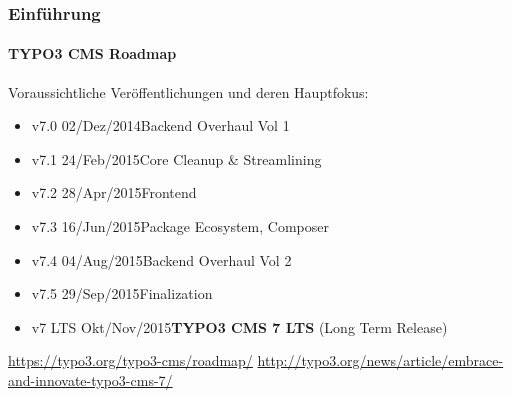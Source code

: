 \begin{frame}[fragile]
	\frametitle{Einführung}
	\framesubtitle{TYPO3 CMS Roadmap}

	Voraussichtliche Veröffentlichungen und deren Hauptfokus:

	\begin{itemize}
		\item v7.0 \tabto{1.1cm}02/Dez/2014\tabto{3.4cm}Backend Overhaul Vol 1
		\item v7.1 \tabto{1.1cm}24/Feb/2015\tabto{3.4cm}Core Cleanup \& Streamlining
		\item v7.2 \tabto{1.1cm}28/Apr/2015\tabto{3.4cm}Frontend
		\item v7.3 \tabto{1.1cm}16/Jun/2015\tabto{3.4cm}Package Ecosystem, Composer
		\item v7.4 \tabto{1.1cm}04/Aug/2015\tabto{3.4cm}Backend Overhaul Vol 2

		\item
			\begingroup
				\color{typo3orange}
					v7.5 \tabto{1.1cm}29/Sep/2015\tabto{3.4cm}Finalization
			\endgroup

		\item v7 LTS \tabto{1.1cm}Okt/Nov/2015\tabto{3.4cm}\textbf{TYPO3 CMS 7 LTS} (Long Term Release)
	\end{itemize}

	\smaller
		\url{https://typo3.org/typo3-cms/roadmap/}\newline
		\url{http://typo3.org/news/article/embrace-and-innovate-typo3-cms-7/}
	\normalsize

\end{frame}

